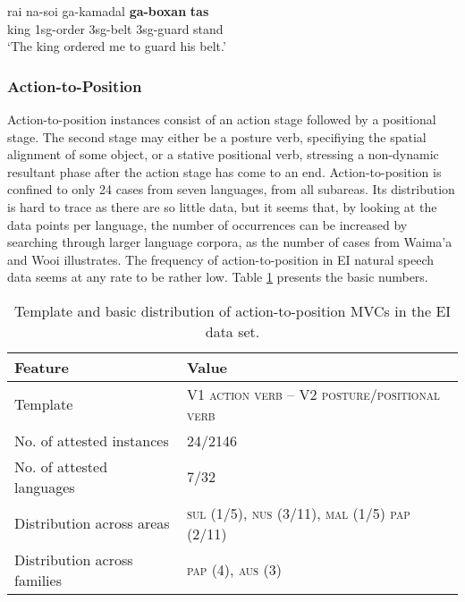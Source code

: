 \ea \label{Teiwa002}
\gll rai na-soi ga-kamadal \textbf{ga-boxan} \textbf{tas} \\
king \acs{1}\acs{sg}-order \acs{3}\acs{sg}-belt \acs{3}\acs{sg}-guard stand \\
\glft `The king ordered me to guard his belt.' \\ 
\z
\xe

\subsubsection{Action-to-Position}

Action-to-position instances consist of an action stage followed by a positional stage. The second stage may either be a posture verb, specifiying the spatial alignment of some object, or a stative positional verb, stressing a non-dynamic resultant phase after the action stage has come to an end. Action-to-position is confined to only 24 cases from seven languages, from all subareas. Its distribution is hard to trace as there are so little data, but it seems that, by looking at the data points per language, the number of occurrences can be increased by searching through larger language corpora, as the number of cases from Waima'a and Wooi illustrates. The frequency of action-to-position in EI natural speech data seems at any rate to be rather low. Table \ref{table:action-to-position} presents the basic numbers.

\begin{table}


\begin{tabular}{ll}
\lsptoprule
Feature&Value\tabularnewline
\hline
Template&V1 \textsc{action verb} -- V2 \textsc{posture/positional verb}\tabularnewline
No. of attested instances& 24/2146 \tabularnewline
No. of attested languages& 7/32 \tabularnewline
Distribution across areas& \textsc{sul} (1/5), \textsc{nus} (3/11), \textsc{mal} (1/5) \textsc{pap} (2/11) \tabularnewline
Distribution across families& \textsc{pap} (4), \textsc{aus} (3) \tabularnewline
\hline
\end{tabular}
\caption[Template and basic distribution of action-to-position MVCs]{Template and basic distribution of action-to-position MVCs in the EI data set.}
\label{table:action-to-position}
\end{table}


